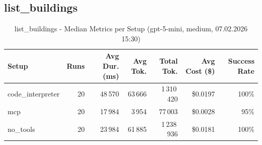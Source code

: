 \documentclass[a4paper,11pt]{article}
\begin{document}
\subsection{list\_buildings}

\begin{table}[H]
\centering
\scriptsize
\caption{list\_buildings - Median Metrics per Setup (gpt-5-mini, medium, 07.02.2026 15:30)}
\label{tab:combined\_list\_buildings\_metrics\_20260207}
\begin{tabular}{l r r r r r r}
\toprule
Setup & Runs & Avg Dur. (ms) & Avg Tok. & Total Tok. & Avg Cost (\$) & Success Rate \\
\midrule
code\_interpreter & 20 & 48\,570 & 63\,666 & 1\,310\,420 & \$0.0197 & 100\% \\
mcp & 20 & 17\,984 & 3\,954 & 77\,003 & \$0.0028 & 95\% \\
no\_tools & 20 & 23\,984 & 61\,885 & 1\,238\,936 & \$0.0181 & 100\% \\
\bottomrule
\end{tabular}
\end{table}
\end{document}
